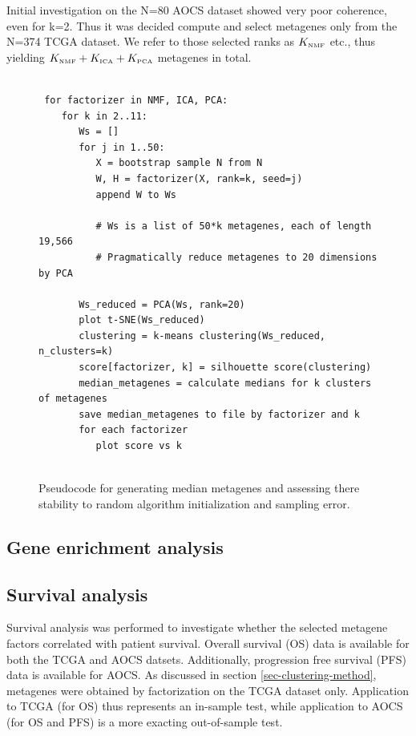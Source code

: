 \documentclass[tikz, 12pt,a4paper,oneside,fleqn]{article}
\begin{document}
Initial investigation on the N=80 AOCS dataset showed very poor coherence, even for k=2.   Thus it was decided compute and select metagenes only from the N=374 TCGA dataset.   We refer to those selected ranks as $K_{\mbox{\tiny NMF}}$ etc., thus yielding $K_{\mbox{\tiny NMF}} + K_{\mbox{\tiny ICA}} + K_{\mbox{\tiny PCA}}$ metagenes in total.

\begin{figure}
\begin{center}
\begin{Verbatim}[baselinestretch=1, frame=single, rulecolor=\color{blue}, label=Metagene Stability Assessment, fontfamily=courier, fontsize=\small]

 for factorizer in NMF, ICA, PCA:
    for k in 2..11:
       Ws = []
       for j in 1..50:
          X = bootstrap sample N from N
          W, H = factorizer(X, rank=k, seed=j)
          append W to Ws
   	     
          # Ws is a list of 50*k metagenes, each of length 19,566
          # Pragmatically reduce metagenes to 20 dimensions by PCA
   	  
       Ws_reduced = PCA(Ws, rank=20)
       plot t-SNE(Ws_reduced)
       clustering = k-means clustering(Ws_reduced, n_clusters=k)
       score[factorizer, k] = silhouette score(clustering)	  
       median_metagenes = calculate medians for k clusters of metagenes
       save median_metagenes to file by factorizer and k
       for each factorizer 
          plot score vs k
      
\end{Verbatim}
\end{center}
\caption{Pseudocode for generating median metagenes and assessing there stability to random algorithm initialization and sampling error.}
\label{fig-clustering-psuedocode}
\end{figure}
	   	  
\subsection{Gene enrichment analysis}

\subsection{Survival analysis}

Survival analysis was performed to investigate whether the selected metagene factors correlated with patient survival.  Overall  survival (OS) data is available for both the TCGA and AOCS datsets.  Additionally, progression free survival (PFS) data is available for AOCS.   As discussed in section \ref{sec-clustering-method}, metagenes were obtained by factorization on the TCGA dataset only.  Application to TCGA (for OS) thus represents an in-sample test, while application to AOCS (for OS and PFS) is a more exacting out-of-sample test.
\end{document}
